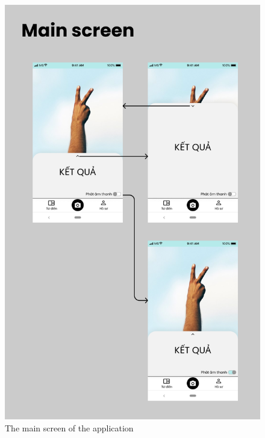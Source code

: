 \begin{figure}[H]
	\centering
	\includegraphics[height=0.8\textheight]{img/Chap5/Main_screen.png}
	\caption{The main screen of the application}
\end{figure}


